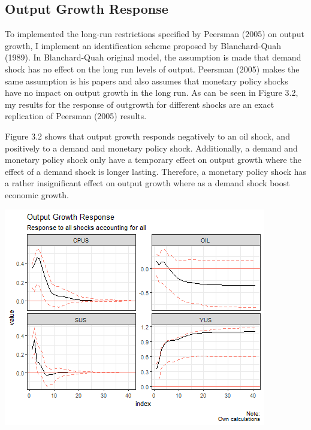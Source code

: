 \documentclass[11pt,preprint, authoryear]{elsarticle}
\let\origfigure\figure
\let\endorigfigure\endfigure
\renewenvironment{figure}[1][2] {
    \expandafter\origfigure\expandafter[H]
} {
    \endorigfigure
}
\numberwithin{equation}{section}
\numberwithin{figure}{section}
\numberwithin{table}{section}
\begin{document}
\hypertarget{output-growth-response}{%
\subsection{Output Growth Response}\label{output-growth-response}}

To implemented the long-run restrictions specified by Peersman (2005) on
output growth, I implement an identification scheme proposed by
Blanchard-Quah (1989). In Blanchard-Quah original model, the assumption
is made that demand shock has no effect on the long run levels of
output. Peersman (2005) makes the same assumption is his papers and also
assumes that monetary policy shocks have no impact on output growth in
the long run. As can be seen in Figure 3.2, my results for the response
of outgrowth for different shocks are an exact replication of Peersman
(2005) results.

Figure 3.2 shows that output growth responds negatively to an oil shock,
and positively to a demand and monetary policy shock. Additionally, a
demand and monetary policy shock only have a temporary effect on output
growth where the effect of a demand shock is longer lasting. Therefore,
a monetary policy shock has a rather insignificant effect on output
growth where as a demand shock boost economic growth.

\begin{figure}[H]

{\centering \includegraphics{replication_files/figure-latex/Figure3-1} 

}

\caption{Response of Output growth\label{Figure3}}\label{fig:Figure3}
\end{figure}
\end{document}
